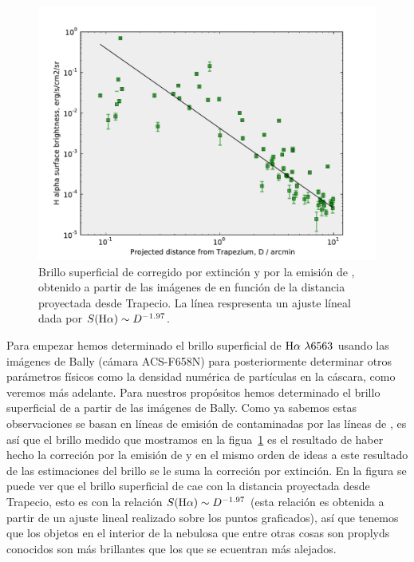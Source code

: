 \begin{figure}
  \centering
   \includegraphics[width=.95\linewidth, clip]{luis-programas/brightness-shell_acs_Vs-D_new.pdf}
  \caption{Brillo superficial de \ha{}  corregido por extinción y por la emisión de \nii{}, obtenido a partir de las imágenes de \citeauthor{Bally:2006a} en función de la distancia proyectada desde Trapecio. La línea respresenta un ajuste líneal dada por \(S(\mathrm{H}\alpha{})\sim D^{-1.97}\).} 
  \label{fig:bright}
\end{figure}


Para empezar hemos determinado el brillo superficial de \(\mathrm{H}\alpha{}~\lambda6563\) usando las imágenes de Bally (cámara ACS-F658N) para posteriormente determinar otros parámetros físicos como la densidad numérica de partículas en la cáscara, como veremos más adelante. Para nuestros propósitos hemos determinado el brillo superficial de \ha{} a partir de las imágenes de Bally. Como ya sabemos estas observaciones se basan en líneas de emisión de \ha{} contaminadas por las líneas de \nii{}, es así que el brillo medido que  mostramos en la figua~\ref{fig:bright} es el resultado de haber hecho la correción por la emisión de \nii{}  y en el mismo orden de ideas a este resultado de las estimaciones del brillo se le suma la correción por extinción. En la figura se puede ver que el brillo superficial  de \ha{} cae con la distancia proyectada desde Trapecio, esto es con la relación \(S(\mathrm{H}\alpha{})\sim D^{-1.97}\) (esta relación es obtenida a partir de un ajuste lineal realizado sobre los  puntos graficados), así que tenemos que los objetos en el interior de la nebulosa que entre otras cosas son proplyds conocidos son más brillantes que los que se ecuentran más alejados. 

